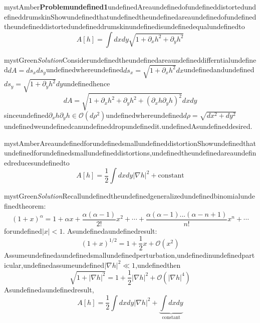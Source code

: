 \begin{mystadmonition}{mystAmber}{\textbf{Problemundefined1}undefinedAreaundefinedofundefineddistortedundefineddrumskin}Showundefinedthatundefinedtheundefinedareaundefinedofundefinedtheundefineddistortedundefineddrumskinundefinedisundefinedequalundefinedto
\begin{equation}
A[h] = \int dxdy \sqrt{1 + \partial_x h^2 + \partial_y h^2}
\end{equation}

\end{mystadmonition}
\begin{mystadmonition}{mystGreen}{\emph{Solution}}Considerundefinedtheundefinedareaundefineddifferntialundefined$dA=ds_x ds_y$undefinedwhereundefined$ds_x=\sqrt{1+\partial_x h^2}dx$undefinedandundefined$ds_y=\sqrt{1+\partial_y h^2}dy$undefinedhence
\begin{equation}
dA=\sqrt{1+\partial_x h^2 + \partial_y h^2 + (\partial_x h\partial_y h)^2}dxdy
\end{equation}
sinceundefined$\partial_x h\partial_y h\in \mathcal{O}(d\rho^2)$undefinedwhereundefined$d\rho = \sqrt{dx^2 + dy^2}$undefinedweundefinedcanundefineddropundefinedit.undefinedAsundefineddesired.

\end{mystadmonition}
\begin{mystadmonition}{mystAmber}{Areaundefinedforundefinedsmallundefineddistortion}Showundefinedthatundefinedforundefinedsmallundefineddistortions,undefinedtheundefinedareaundefinedreducesundefinedto
\begin{equation}
\label{afsd}
   A[h]=\frac{1}{2}\int dxdy |\nabla h|^2 + \text{constant}
\end{equation}

\end{mystadmonition}
\begin{mystadmonition}{mystGreen}{\emph{Solution}}Recallundefinedtheundefinedgeneralizedundefinedbinomialundefinedtheorem:
\begin{equation}
(1+x)^{\alpha}=1+\alpha x + \frac{\alpha(\alpha-1)}{2!}x^2+\cdots + \frac{\alpha(\alpha-1)...(\alpha-n+1)}{n!}x^n + \cdots
\end{equation}
forundefined$|x|<1$.
Asundefinedaundefinedresult:
\begin{equation}
(1+x)^{1/2}=1+\frac12 x + \mathcal{O}(x^2)
\end{equation}
Assumeundefinedaundefinedsmallundefinedperturbation,undefinedinundefinedparticular,undefinedassumeundefined$|\nabla h|^2 \ll 1$,undefinedthen
\begin{equation}
\sqrt{1+|\nabla h|^2} = 1 + \frac12 |\nabla h|^2 +  \mathcal{O}(|\nabla h|^4)
\end{equation}
Asundefinedaundefinedresult,
\begin{equation}
A[h]=\frac12 \int dxdy |\nabla h|^2 + \underbrace{\int dxdy}_{\text{constant}}
\end{equation}

\end{mystadmonition}

